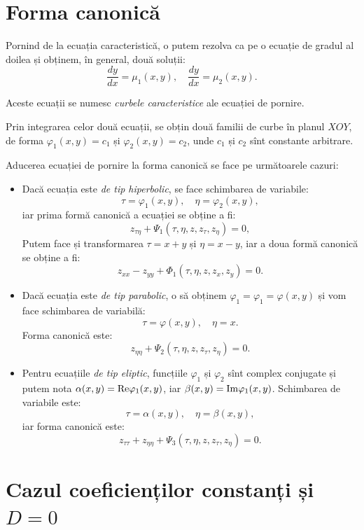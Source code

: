 
\section{Forma canonică}

Pornind de la ecuația caracteristică, o putem rezolva ca pe o ecuație de gradul
al doilea și obținem, în general, două soluții:
\[
  \dfrac{dy}{dx} = \mu_1(x, y), \quad \dfrac{dy}{dx} = \mu_2(x, y).
\]

Aceste ecuații se numesc \emph{curbele caracteristice} ale ecuației de pornire.

Prin integrarea celor două ecuații, se obțin două familii de curbe în planul
$ XOY $, de forma $ \varphi_1(x, y) = c_1 $ și $ \varphi_2(x, y) = c_2 $, unde
$ c_1 $ și $ c_2 $ sînt constante arbitrare.

Aducerea ecuației de pornire la forma canonică se face pe următoarele cazuri:
\begin{itemize}
\item Dacă ecuația este \emph{de tip hiperbolic}, se face schimbarea de variabile:
  \[
    \tau = \varphi_1(x, y), \quad \eta = \varphi_2(x, y),
  \]
  iar prima formă canonică a ecuației se obține a fi:
  \[
    z_{\tau\eta} + \Psi_1(\tau, \eta, z, z_\tau, z_\eta) = 0,
  \]
  Putem face și transformarea $ \tau = x + y $ și $ \eta = x - y $, iar a doua
  formă canonică se obține a fi:
  \[
    z_{xx} - z_{yy} + \Phi_1(\tau, \eta, z, z_x, z_y) = 0.
  \]
\item Dacă ecuația este \emph{de tip parabolic}, o să obținem
  $ \varphi_1 = \varphi_1 = \varphi(x, y) $ și vom face schimbarea de variabilă:
  \[
    \tau = \varphi(x, y), \quad \eta = x.
  \]
  Forma canonică este:
  \[
    z_{\eta\eta} + \Psi_2(\tau, \eta, z, z_\tau, z_\eta) = 0.
  \]
\item Pentru ecuațiile \emph{de tip eliptic}, funcțiile $ \varphi_1 $ și $ \varphi_2 $
  sînt complex conjugate și putem nota $ \alpha(x, y) = \mathrm{Re} \varphi_1(x, y) $,
  iar $ \beta(x, y) = \mathrm{Im}\varphi_1(x, y) $. Schimbarea de variabile este:
  \[
    \tau = \alpha(x, y), \quad \eta = \beta(x, y),
  \]
  iar forma canonică este:
  \[
    z_{\tau\tau} + z_{\eta\eta} + \Psi_3(\tau, \eta, z, z_\tau, z_\eta) = 0.
  \]
\end{itemize}


\section{Cazul coeficienților constanți și $D = 0$}


